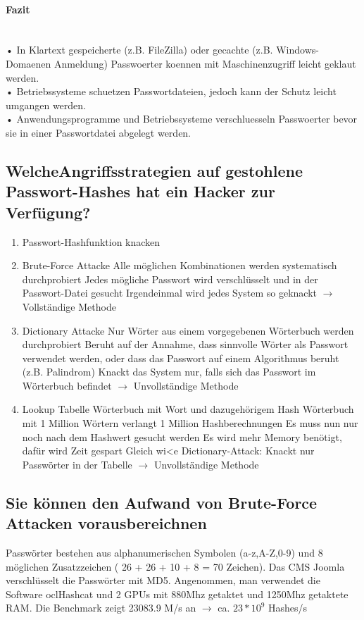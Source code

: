 \documentclass[a4paper, 11pt, nofootinbib]{article}
\begin{document}
\paragraph{Fazit}\mbox{}\\
• In Klartext gespeicherte (z.B. FileZilla) oder gecachte (z.B. Windows-
Domaenen Anmeldung) Passwoerter koennen mit Maschinenzugriff leicht
geklaut werden.\\
• Betriebssysteme schuetzen Passwortdateien, jedoch kann der Schutz leicht
umgangen werden.\\
• Anwendungsprogramme und Betriebssysteme verschluesseln Passwoerter
bevor sie in einer Passwortdatei abgelegt werden.\\

\subsection{WelcheAngriffsstrategien auf gestohlene Passwort-Hashes hat ein Hacker zur Verfügung?}

\begin{enumerate}
	\item Passwort-Hashfunktion knacken
	\item Brute-Force Attacke
		\subitem Alle möglichen Kombinationen werden systematisch durchprobiert
		\subitem Jedes mögliche Passwort wird verschlüsselt und in der Passwort-Datei gesucht
		\subitem Irgendeinmal wird jedes System so geknackt $\rightarrow$ Vollständige Methode
	\item Dictionary Attacke
		\subitem Nur Wörter aus einem vorgegebenen Wörterbuch werden durchprobiert
		\subitem Beruht auf der Annahme, dass sinnvolle Wörter als Passwort verwendet werden, oder dass das Passwort auf einem Algorithmus beruht (z.B. Palindrom)
		\subitem Knackt das System nur, falls sich das Passwort im Wörterbuch befindet $\rightarrow$ Unvollständige Methode
	\item Lookup Tabelle
		\subitem Wörterbuch mit Wort und dazugehörigem Hash
		\subitem Wörterbuch mit 1 Million Wörtern verlangt 1 Million Hashberechnungen
		\subitem Es muss nun nur noch nach dem Hashwert gesucht werden
		\subitem Es wird mehr Memory benötigt, dafür wird Zeit gespart
		\subitem Gleich wi<e Dictionary-Attack: Knackt nur Passwörter in der Tabelle $\rightarrow$ Unvollständige Methode
\end{enumerate}

\subsection{Sie können den Aufwand von Brute-Force Attacken vorausbereichnen}
Passwörter bestehen aus alphanumerischen Symbolen (a-z,A-Z,0-9) und 8 möglichen Zusatzzeichen ( 26 + 26 + 10 + 8 = 70 Zeichen). Das CMS Joomla verschlüsselt die Passwörter mit MD5. Angenommen, man verwendet die Software oclHashcat und 2 GPUs mit 880Mhz getaktet und 1250Mhz getaktete RAM. Die Benchmark zeigt 23083.9 M/s an $\rightarrow$ ca. $23 * 10^{9}$ Hashes/s
\end{document}

